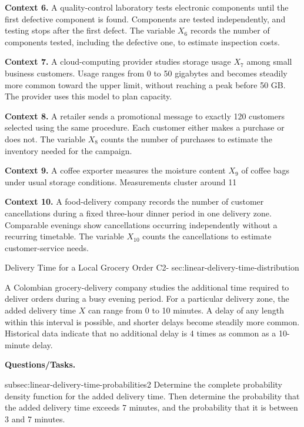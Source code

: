 {		\textbf{Context 6.} A quality-control laboratory tests electronic components until the first defective component is found. Components are tested independently, and testing stops after the first defect. The variable \(X_6\) records the number of components tested, including the defective one, to estimate inspection costs.
		
		\textbf{Context 7.} A cloud-computing provider studies storage usage \(X_7\) among small business customers. Usage ranges from 0 to 50 gigabytes and becomes steadily more common toward the upper limit, without reaching a peak before 50 GB. The provider uses this model to plan capacity.
		
		\textbf{Context 8.} A retailer sends a promotional message to exactly 120 customers selected using the same procedure. Each customer either makes a purchase or does not. The variable \(X_8\) counts the number of purchases to estimate the inventory needed for the campaign.
		
		\textbf{Context 9.} A coffee exporter measures the moisture content \(X_9\) of coffee bags under usual storage conditions. Measurements cluster around 11%
		
		\textbf{Context 10.} A food-delivery company records the number of customer cancellations during a fixed three-hour dinner period in one delivery zone. Comparable evenings show cancellations occurring independently without a recurring timetable. The variable \(X_{10}\) counts the cancellations to estimate customer-service needs.
		
	}
	
	\sectionScored
	{Delivery Time for a Local Grocery Order}
	{C2-}
	{sec:linear-delivery-time-distribution}
	{
		A Colombian grocery-delivery company studies the additional time required to deliver orders during a busy evening period. For a particular delivery zone, the added delivery time \(X\) can range from 0 to 10 minutes. A delay of any length within this interval is possible, and shorter delays become steadily more common. Historical data indicate that no additional delay is 4 times as common as a 10-minute delay.
		
		\textbf{Questions/Tasks.}
		\begin{enumerate}
			\CriterionTask
			{subsec:linear-delivery-time-probabilities}{2}
			{Determine the complete probability density function for the added delivery time. Then determine the probability that the added delivery time exceeds 7 minutes, and the probability that it is between 3 and 7 minutes. }
		\end{enumerate}
		
	}

